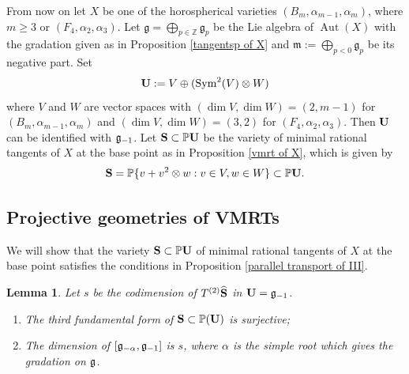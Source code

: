 \documentclass[12pt]{amsart}
\theoremstyle{plain}
\newtheorem{lemma} [theorem]{Lemma}
\theoremstyle{definition}
\def\Sym{\operatorname{Sym}}
\def\Aut{\operatorname{Aut}}
\begin{document}
From now on let $X$ be one of the horospherical varieties $(B_m, \alpha_{m-1}, \alpha_{m})$, where $m \geq 3$ or $(F_4, \alpha_2, \alpha_3)$.
Let $\mathfrak g = \bigoplus_{p \in \mathbb Z} \mathfrak g_p $ be the Lie algebra of  $\Aut(X)$ with the  gradation given as in Proposition \ref{tangentsp of X} and  $\mathfrak m:= \bigoplus _{p <0} \mathfrak g_p$ be its negative part.
Set $${\bf U}:= V \oplus (\Sym^2(V) \otimes W)$$ where $V$ and $W$ are vector spaces with $(\dim V, \dim W)=(2, m-1)$ for $(B_m, \alpha_{m-1}, \alpha_{m})$ and $(\dim V, \dim W)=(3, 2)$ for $(F_4, \alpha_2, \alpha_3)$. Then $\bf U$ can be identified with $\frak g_{-1}$. Let ${{\bf S}}  \subset \mathbb P \bf U$ be the variety of minimal rational tangents of $X$ at the base point as in Proposition \ref{vmrt of X}, which is given by
$${\bf S}=\mathbb P \{ v + v^2 \otimes w: v \in V, w \in W\} \subset \mathbb P\bf U.$$

\subsection{Projective geometries of VMRTs}

We will show that  the variety ${{\bf S}}  \subset \mathbb P \bf U$   of minimal rational tangents of $X$ at the base point satisfies the conditions in Proposition \ref{parallel transport of III}.

\begin{lemma} \label{parallel transport of III-X case} %
 Let $s$ be  the codimension of $T^{(2)}\widehat{\bf S}$ in ${\bf U}=\frak g_{-1}$.

  \begin{enumerate}
  \item The third fundamental form of ${\bf S} \subset \mathbb P(\bf U)$ is surjective;
  \item The dimension of $  [\frak g_{-\alpha}, \frak g_{-1}]   $ is   $  s$, where $\alpha$ is the simple root which gives the gradation on $\frak g$.
\end{enumerate}
\end{lemma}
\end{document}
